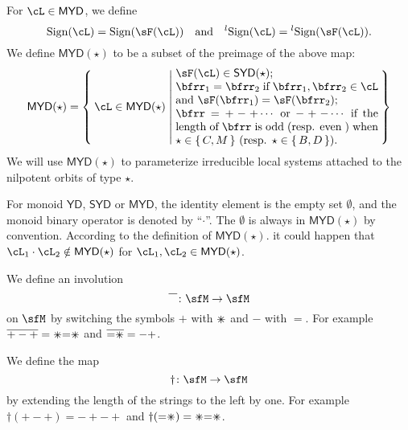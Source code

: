 \documentclass[12pt,a4paper]{amsart}
\def\YD{{\mathsf{YD}}}
\def\SYD{{\mathsf{SYD}}}
\def\MYD{{\mathsf{MYD}}}
\numberwithin{equation}{section}
\theoremstyle{remark}
\def\lsign{{}^l\mathrm{Sign}}
\def\ssign{\mathrm{Sign}}
\def\umm{{=}}
\def\upp{{\ast}}
\def\upp{
  {{\setbox0\hbox{$\times$}
      \rlap{\hbox to \wd0{\hss$+$\hss}}\box0
    }}
}
\begin{document}
\begin{itemize}
        For $\cL\in\MYD$, we define
        \[
        \ssign(\cL) = \ssign(\sF(\cL)) \quad \text{and} \quad \lsign(\cL) = \lsign(\sF(\cL)).
        \]
        We define $\MYD(\star)$ to be a subset of the preimage of the above map:
        \[
        \MYD(\star) =\Set{\cL\in \MYD(\star)|\begin{minipage}{18em}
            $\sF(\cL)\in \SYD(\star)$;\\
            $\bfrr_{1}=\bfrr_{2}$ if $\bfrr_1, \bfrr_2\in \cL$ and
            $\sF(\bfrr_{1})=\sF(\bfrr_{2})$;\\
            $\bfrr = +-+\cdots $ or $-+-\cdots $ if the length of $\bfrr$ is odd
            (resp. even ) when $\star \in \set{C,M}$ (resp.
            $\star\in \set{B,D}$).
          \end{minipage}
        }
        \]
        We will use $\MYD(\star)$ to parameterize irreducible local systems
        attached to the nilpotent orbits of type $\star$.
\end{itemize}
For monoid  $\YD$, $\SYD$ or $\MYD$, the identity element is the empty set
$\emptyset$, and the monoid binary operator is denoted by
``$\cdot$''.
The  $\emptyset$ is  always in
$\MYD(\star)$ by convention.
According to the definition of $\MYD(\star)$.  it could happen that $\cL_{1}\cdot \cL_{2}\notin \MYD(\star)$ for
$\cL_{1},\cL_{2}\in \MYD(\star)$.

%

We define an involution
\begin{equation}\label{eq:def.bar}
 \overline{\phantom{+}}\colon \sfM\rightarrow \sfM
\end{equation}
on $\sfM$  by
switching the symbols $+$ with $\upp$  and $-$ with $\umm$.
For example $\overline{+-+}= \upp\umm\upp$ and $\overline{ \umm\upp } = -+$.

We define the map
\begin{equation}\label{eq:def.dagger}
  \dagger\colon \sfM\rightarrow \sfM
\end{equation}
by extending the length of
the strings to the left by one.
For example $\dagger(+-+) = -+-+$ and $\dagger(\umm\upp)=\upp\umm\upp$.
\end{document}
